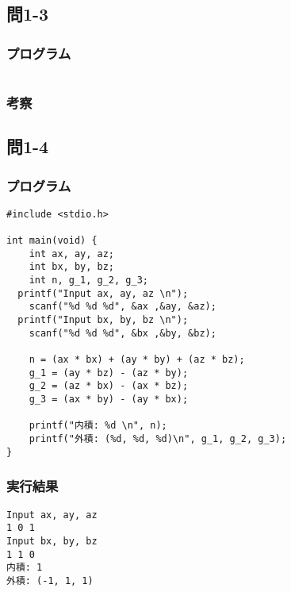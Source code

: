 \documentclass{jarticle}
\begin{document}
\subsection{問1-3\\}
\subsubsection{プログラム\\}
\begin{breakbox}
\begin{verbatim}

\end{verbatim}
\end{breakbox}
\subsubsection{考察\\}


\subsection{問1-4\\}
\subsubsection{プログラム\\}
\begin{breakbox}
\begin{verbatim}
#include <stdio.h>

int main(void) {
	int ax, ay, az;
	int bx, by, bz;
	int n, g_1, g_2, g_3;
  printf("Input ax, ay, az \n");
	scanf("%d %d %d", &ax ,&ay, &az);
  printf("Input bx, by, bz \n");
	scanf("%d %d %d", &bx ,&by, &bz);
  
	n = (ax * bx) + (ay * by) + (az * bz); 
	g_1 = (ay * bz) - (az * by); 
	g_2 = (az * bx) - (ax * bz); 
	g_3 = (ax * by) - (ay * bx);

	printf("内積: %d \n", n);
	printf("外積: (%d, %d, %d)\n", g_1, g_2, g_3); 
}
\end{verbatim}
\end{breakbox}
\subsubsection{実行結果\\}
\begin{breakbox}
\begin{verbatim}
Input ax, ay, az 
1 0 1
Input bx, by, bz 
1 1 0
内積: 1 
外積: (-1, 1, 1)
\end{verbatim}
\end{breakbox}
\end{document}
